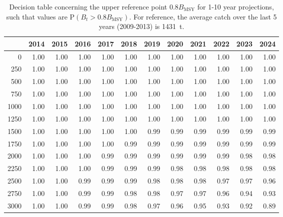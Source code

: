 \documentclass[11pt]{book}
\newcommand{\Bmsy}{B_\mathrm{MSY}}
\begin{document}
\begin{table}[!ht]
\centering
\caption{Decision table concerning the upper reference point $0.8 \Bmsy$ for 1-10 year projections, such that values are P$(B_t > 0.8 \Bmsy)$. For reference, the average catch over the last 5 years (2009-2013) is 1431~t.} 
\label{tab:URP}
\begin{tabular}{rrrrrrrrrrrr}
  \\[-1.0ex] \hline
 & 2014 & 2015 & 2016 & 2017 & 2018 & 2019 & 2020 & 2021 & 2022 & 2023 & 2024 \\ 
  \hline
0 & 1.00 & 1.00 & 1.00 & 1.00 & 1.00 & 1.00 & 1.00 & 1.00 & 1.00 & 1.00 & 1.00 \\ 
  250 & 1.00 & 1.00 & 1.00 & 1.00 & 1.00 & 1.00 & 1.00 & 1.00 & 1.00 & 1.00 & 1.00 \\ 
  500 & 1.00 & 1.00 & 1.00 & 1.00 & 1.00 & 1.00 & 1.00 & 1.00 & 1.00 & 1.00 & 1.00 \\ 
  750 & 1.00 & 1.00 & 1.00 & 1.00 & 1.00 & 1.00 & 1.00 & 1.00 & 1.00 & 1.00 & 1.00 \\ 
  1000 & 1.00 & 1.00 & 1.00 & 1.00 & 1.00 & 1.00 & 1.00 & 1.00 & 1.00 & 1.00 & 1.00 \\ 
  1250 & 1.00 & 1.00 & 1.00 & 1.00 & 1.00 & 1.00 & 1.00 & 1.00 & 1.00 & 1.00 & 1.00 \\ 
  1500 & 1.00 & 1.00 & 1.00 & 1.00 & 1.00 & 0.99 & 0.99 & 0.99 & 0.99 & 0.99 & 0.99 \\ 
  1750 & 1.00 & 1.00 & 1.00 & 1.00 & 0.99 & 0.99 & 0.99 & 0.99 & 0.99 & 0.99 & 0.99 \\ 
  2000 & 1.00 & 1.00 & 1.00 & 0.99 & 0.99 & 0.99 & 0.99 & 0.99 & 0.99 & 0.98 & 0.98 \\ 
  2250 & 1.00 & 1.00 & 1.00 & 0.99 & 0.99 & 0.99 & 0.98 & 0.98 & 0.98 & 0.98 & 0.98 \\ 
  2500 & 1.00 & 1.00 & 0.99 & 0.99 & 0.99 & 0.98 & 0.98 & 0.98 & 0.97 & 0.97 & 0.96 \\ 
  2750 & 1.00 & 1.00 & 0.99 & 0.99 & 0.98 & 0.98 & 0.97 & 0.97 & 0.96 & 0.94 & 0.93 \\ 
  3000 & 1.00 & 1.00 & 0.99 & 0.99 & 0.98 & 0.97 & 0.96 & 0.95 & 0.93 & 0.92 & 0.89 \\ 
   \hline
\end{tabular}
\end{table}
\end{document}
